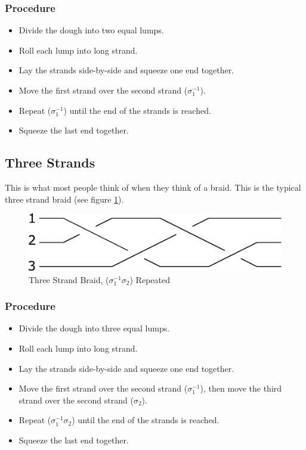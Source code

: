 \documentclass[10pt, openany]{book}
\begin{document}
\subsubsection{Procedure}
\begin{itemize}
  \item Divide the dough into two equal lumps.
  \item Roll each lump into long strand.
  \item Lay the strands side-by-side and squeeze one end together.
  \item Move the first strand over the second strand ($\sigma^{-1}_1$).
  \item Repeat ($\sigma^{-1}_1$) until the end of the strands is reached.
  \item Squeeze the last end together.
\end{itemize}

\subsection{Three Strands}
This is what most people think of when they think of a braid.  This is the typical three strand braid (see figure \ref{fig:3Strand}).

\begin{figure}[h]
  \center
  \includegraphics{Figures/3-strands.pdf}
  \caption{Three Strand Braid, ($\sigma^{-1}_1\sigma_2$) Repeated}
  \label{fig:3Strand}
\end{figure}

\subsubsection{Procedure}
\begin{itemize}
  \item Divide the dough into three equal lumps.
  \item Roll each lump into long strand.
  \item Lay the strands side-by-side and squeeze one end together.
  \item Move the first strand over the second strand ($\sigma^{-1}_1$), then move the third strand over the second strand ($\sigma_2$).
  \item Repeat ($\sigma^{-1}_1\sigma_2$) until the end of the strands is reached.
  \item Squeeze the last end together.
\end{itemize}
\end{document}
